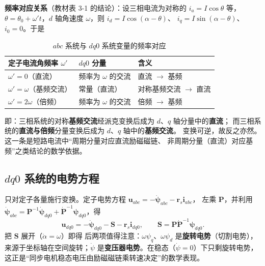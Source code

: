 \textbf{频率对应关系}（教材表 3-1 的结论）：设三相电流为对称的 $i_a=I\cos\theta$ 等，
$\theta=\theta_0+\omega' t$，$d$ 轴角速度 $\omega$，则 $i_d=I\cos(\alpha-\theta)$、
$i_q=I\sin(\alpha-\theta)$、$i_0=0$。于是
\begin{table}[htbp]
  \centering
  \caption{$abc$ 系统与 $dq0$ 系统变量的频率对应}
  \small
  \begin{tabular}{@{}lll@{}}
    \toprule
    定子电流角频率 $\omega'$ & $dq0$ 分量 & 含义 \\
    \midrule
    $\omega'=0$（直流） & 频率为 $\omega$ 的交流 & 直流 $\to$ 基频 \\
    $\omega'=\omega$（基频交流） & 常量（直流） & 对称基频交流 $\to$ 直流 \\
    $\omega'=2\omega$（倍频） & 频率为 $\omega$ 的交流 & 倍频 $\to$ 基频 \\
    \bottomrule
  \end{tabular}
\end{table}
即：三相系统的对称\textbf{基频交流}经派克变换后成为 $d$、$q$ 轴分量中的\textbf{直流}；
而三相系统的\textbf{直流与倍频}分量变换后成为 $d$、$q$ 轴中的\textbf{基频交流}。
变换可逆，故反之亦然。这一条是短路电流中“周期分量对应直流励磁磁链、
非周期分量（直流）对应基频”之类结论的数学依据。

\subsection{$dq0$ 系统的电势方程}

只对定子各量施行变换。定子电势方程 $\boldsymbol u_{abc}=-\dot{\boldsymbol\psi}_{abc}-\boldsymbol r_s\boldsymbol i_{abc}$，
左乘 $\boldsymbol P$，并利用 $\dot{\boldsymbol\psi}_{abc}=\boldsymbol P^{-1}\dot{\boldsymbol\psi}_{dq0}
+\dot{\boldsymbol P}^{-1}\boldsymbol\psi_{dq0}$，得
\begin{equation}
  \boldsymbol u_{dq0}=-\dot{\boldsymbol\psi}_{dq0}-\boldsymbol S-\boldsymbol r_s\boldsymbol i_{dq0},
  \qquad \boldsymbol S=\boldsymbol P\dot{\boldsymbol P}^{-1}\boldsymbol\psi_{dq0}.
\end{equation}
把 $\boldsymbol S$ 展开（$\dot\alpha=\omega$）即得
后两项值得注意：$\omega\psi_q$、$\omega\psi_d$ 是\textbf{旋转电势}（切割电势），
来源于坐标轴在空间旋转；$\dot\psi$ 是\textbf{变压器电势}。在稳态（$\dot\psi=0$）下只剩旋转电势，
这正是“同步电机稳态电压由励磁磁链乘转速决定”的数学表现。

